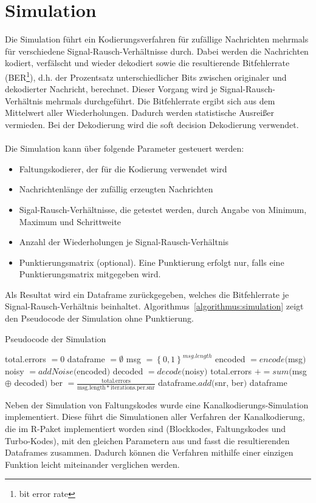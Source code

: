 \section{Simulation}
\label{kapitel:implementierung_simulation}
Die Simulation führt ein Kodierungsverfahren für zufällige Nachrichten mehrmals für verschiedene Signal-Rausch-Verhältnisse durch. Dabei werden die Nachrichten kodiert, verfälscht und wieder dekodiert sowie die resultierende Bitfehlerrate (BER\footnote{bit error rate}), d.h. der Prozentsatz unterschiedlicher Bits zwischen originaler und dekodierter Nachricht, berechnet. Dieser Vorgang wird je Signal-Rausch-Verhältnis mehrmals durchgeführt. Die Bitfehlerrate ergibt sich aus dem Mittelwert aller Wiederholungen. Dadurch werden statistische Ausreißer vermieden. Bei der Dekodierung wird die soft decision Dekodierung verwendet.
\\
\\
Die Simulation kann über folgende Parameter gesteuert werden:
\begin{itemize}
\item Faltungskodierer, der für die Kodierung verwendet wird
\item Nachrichtenlänge der zufällig erzeugten Nachrichten
\item Sigal-Rausch-Verhältnisse, die getestet werden, durch Angabe von Minimum, Maximum und Schrittweite
\item Anzahl der Wiederholungen je Signal-Rausch-Verhältnis
\item Punktierungsmatrix (optional). Eine Punktierung erfolgt nur, falls eine Punktierungsmatrix mitgegeben wird.
\end{itemize}
Als Resultat wird ein Dataframe zurückgegeben, welches die Bitfehlerrate je Signal-Rausch-Verhältnis beinhaltet. Algorithmus~\ref{algorithmus:simulation} zeigt den Pseudocode der Simulation ohne Punktierung.
\begin{algorithm}[H]
\renewcommand{\algorithmicforall}{\textbf{for each}}
\caption{Pseudocode der Simulation}
\label{algorithmus:simulation}
\begin{algorithmic}[1]
\STATE total.errors $=0$
\STATE dataframe $=\emptyset$
		\STATE msg $={\left\lbrace 0, 1\right\rbrace }^{\mathit{msg.length}}$
		\STATE encoded $=\mathit{encode}($msg$)$
		\STATE noisy $=\mathit{addNoise}($encoded$)$
		\STATE decoded $=\mathit{decode}($noisy$)$
		\STATE total.errors $+=\mathit{sum}($msg $\oplus$ decoded$)$
	\ENDFOR
	\STATE ber $=\frac{\mathrm{total.errors}}{\mathrm{msg.length}\ast\mathrm{iterations.per.snr}}$
	\STATE dataframe.$\mathit{add}($snr, ber$)$
\ENDFOR
\RETURN dataframe
\end{algorithmic}
\end{algorithm}
Neben der Simulation von Faltungskodes wurde eine Kanalkodierungs-Simulation implementiert. Diese führt die Simulationen aller Verfahren der Kanalkodierung, die im R-Paket implementiert worden sind  (Blockkodes, Faltungskodes und Turbo-Kodes), mit den gleichen Parametern aus und fasst die resultierenden Dataframes zusammen. Dadurch können die Verfahren mithilfe einer einzigen Funktion leicht miteinander verglichen werden.
%
